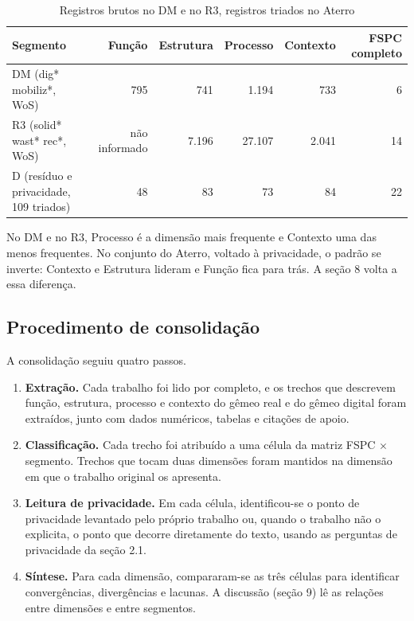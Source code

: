 \documentclass[12pt,a4paper,article,oneside,english,brazil]{abntex2}
\newcommand{\fontetab}[1]{\par\vspace{3pt}{\small\noindent Fonte: #1\par}}
\begin{document}
\begin{table}[!htbp]
\centering
\caption{Registros brutos no DM e no R3, registros triados no Aterro}
\label{tab:contagens}
\small
\begin{tabularx}{\linewidth}{Y r r r r r}
\hline
\textbf{Segmento} & \textbf{Função} & \textbf{Estrutura} & \textbf{Processo} & \textbf{Contexto} & \textbf{FSPC completo}\\
\hline
DM (dig* mobiliz*, WoS) & 795 & 741 & 1.194 & 733 & 6\\
R3 (solid* wast* rec*, WoS) & não informado & 7.196 & 27.107 & 2.041 & 14\\
D (resíduo e privacidade, 109 triados) & 48 & 83 & 73 & 84 & 22\\
\hline
\end{tabularx}
\fontetab{Elaborado pelo autor (2026).}
\end{table}

No DM e no R3, Processo é a dimensão mais frequente e Contexto uma das menos frequentes. No conjunto do Aterro, voltado à privacidade, o padrão se inverte: Contexto e Estrutura lideram e Função fica para trás. A seção 8 volta a essa diferença.

\subsection{Procedimento de consolidação}

A consolidação seguiu quatro passos.

\begin{enumerate}
\item \textbf{Extração.} Cada trabalho foi lido por completo, e os trechos que descrevem função, estrutura, processo e contexto do gêmeo real e do gêmeo digital foram extraídos, junto com dados numéricos, tabelas e citações de apoio.
\item \textbf{Classificação.} Cada trecho foi atribuído a uma célula da matriz FSPC $\times$ segmento. Trechos que tocam duas dimensões foram mantidos na dimensão em que o trabalho original os apresenta.
\item \textbf{Leitura de privacidade.} Em cada célula, identificou-se o ponto de privacidade levantado pelo próprio trabalho ou, quando o trabalho não o explicita, o ponto que decorre diretamente do texto, usando as perguntas de privacidade da seção 2.1.
\item \textbf{Síntese.} Para cada dimensão, compararam-se as três células para identificar convergências, divergências e lacunas. A discussão (seção 9) lê as relações entre dimensões e entre segmentos.
\end{enumerate}
\end{document}
